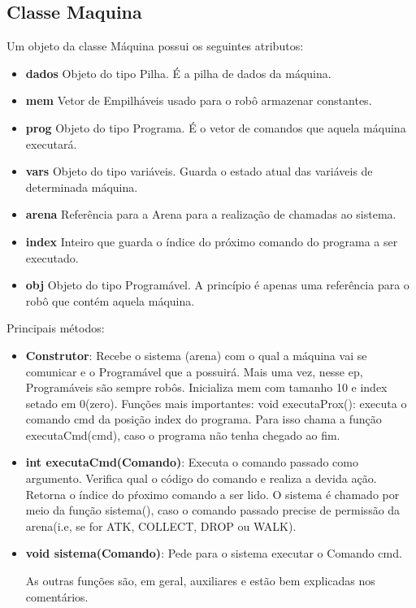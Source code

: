\documentclass[11pt]{article}
\begin{document}
\subsection{Classe Maquina}

Um objeto da classe Máquina possui os seguintes atributos:
\begin{itemize}

\item \textbf{dados}
	Objeto do tipo Pilha. É a pilha de dados da máquina.
\item \textbf{mem}
	Vetor de Empilháveis usado para o robô armazenar constantes.
\item \textbf{prog}
	Objeto do tipo Programa. É o vetor de comandos que aquela máquina executará.
\item \textbf{vars}
	Objeto do tipo variáveis. Guarda o estado atual das variáveis de determinada máquina.
\item \textbf{arena}
	Referência para a Arena para a realização de chamadas ao sistema.
\item \textbf{index}
	Inteiro que guarda o índice do próximo comando do programa a ser executado.
\item \textbf{obj}
	Objeto do tipo Programável. A princípio é apenas uma referência para o robô que contém aquela máquina.
\end{itemize}


Principais métodos:

\begin{itemize}

	\item \textbf{Construtor}: Recebe o sistema (arena) com o qual a máquina vai se comunicar e o Programável que a possuirá.
				Mais uma vez, nesse ep, Programáveis são sempre robôs. Inicializa mem com tamanho 10 e index setado em 0(zero).
	Funções mais importantes:
		void executaProx(): executa o comando cmd da posição index do programa. Para isso chama a função executaCmd(cmd), caso o programa não tenha chegado ao fim.
		
	\item \textbf{{\color{red}int} executaCmd({\color{red}Comando})}: Executa o comando passado como argumento. Verifica  qual o código do comando e realiza a devida ação.
									 Retorna o índice do pŕoximo comando a ser lido. O sistema é chamado por meio da função sistema(), caso o comando passado precise de permissão da arena(i.e, se for ATK, COLLECT, DROP ou WALK).

	\item \textbf{{\color{red}void} sistema({\color{red}Comando})}:	 Pede para o sistema executar o Comando cmd.

		As outras funções são, em geral, auxiliares e estão bem explicadas nos comentários.

\end{itemize}
\end{document}
